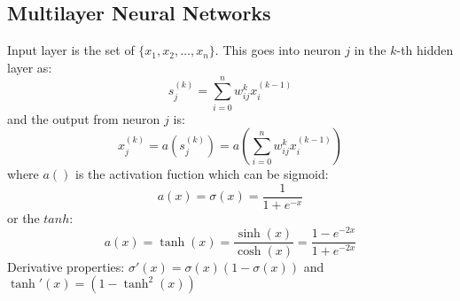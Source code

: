 \documentclass[a4paper,10pt]{article}
\begin{document}
\subsection{Multilayer Neural Networks}
Input layer is the set of $\{x_1, x_2, \ldots, x_n\}$.  This goes into neuron $j$ in the $k$-th hidden layer as:
$$
s_j^{(k)} = \sum_{i=0}^n w_{ij}^{k} x_i^{(k-1)}
$$
and the output from neuron $j$ is:
$$
x_j^{(k)} = a\left( s_j^{(k)}\right) = a\left(\sum_{i=0}^n w_{ij}^{k} x_i^{(k-1)}\right)
$$
where $a()$ is the activation fuction which can be sigmoid:
$$
a(x) = \sigma(x) = \frac{1}{1 + e^{-x}}
$$
or the $tanh$:
$$
a(x) = \tanh(x) = \frac{\sinh(x)}{\cosh(x)} = \frac{1- e^{-2x}}{1 + e^{-2x}}
$$
Derivative properties: $\sigma'(x) = \sigma(x)(1 - \sigma(x))$ and $\tanh'(x) = (1 - \tanh^2(x))$
\end{document}
